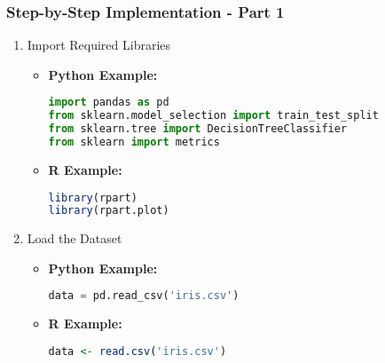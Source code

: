 \documentclass[aspectratio=169]{beamer}
\begin{document}
\begin{frame}[fragile]
    \frametitle{Step-by-Step Implementation - Part 1}
    \begin{enumerate}
        \item Import Required Libraries
        \begin{itemize}
            \item \textbf{Python Example:}
            \begin{lstlisting}[language=Python]
import pandas as pd
from sklearn.model_selection import train_test_split
from sklearn.tree import DecisionTreeClassifier
from sklearn import metrics
            \end{lstlisting}
            \item \textbf{R Example:}
            \begin{lstlisting}[language=R]
library(rpart)
library(rpart.plot)
            \end{lstlisting}
        \end{itemize}
        
        \item Load the Dataset
        \begin{itemize}
            \item \textbf{Python Example:}
            \begin{lstlisting}[language=Python]
data = pd.read_csv('iris.csv')
            \end{lstlisting}
            \item \textbf{R Example:}
            \begin{lstlisting}[language=R]
data <- read.csv('iris.csv')
            \end{lstlisting}
        \end{itemize}
    \end{enumerate}
\end{frame}
\end{document}
